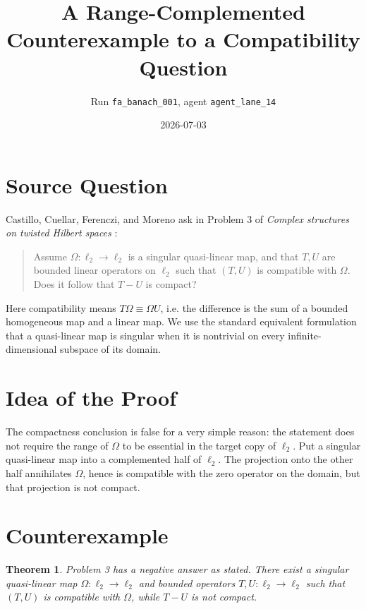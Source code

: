 \documentclass[11pt]{article}
\title{A Range-Complemented Counterexample to a Compatibility Question}
\author{Run \texttt{fa\_banach\_001}, agent \texttt{agent\_lane\_14}}
\date{2026-07-03}
\newtheorem{theorem}{Theorem}
\begin{document}
\maketitle

\section*{Source Question}

Castillo, Cuellar, Ferenczi, and Moreno ask in Problem 3 of
\emph{Complex structures on twisted Hilbert spaces} \cite{CCFM}:

\begin{quote}
Assume $\Omega:\ell_2\to \ell_2$ is a singular quasi-linear map, and that
$T,U$ are bounded linear operators on $\ell_2$ such that $(T,U)$ is compatible
with $\Omega$. Does it follow that $T-U$ is compact?
\end{quote}

Here compatibility means $T\Omega \equiv \Omega U$, i.e. the difference is
the sum of a bounded homogeneous map and a linear map. We use the standard
equivalent formulation that a quasi-linear map is singular when it is
nontrivial on every infinite-dimensional subspace of its domain.

\section*{Idea of the Proof}

The compactness conclusion is false for a very simple reason: the statement
does not require the range of $\Omega$ to be essential in the target copy of
$\ell_2$. Put a singular quasi-linear map into a complemented half of
$\ell_2$. The projection onto the other half annihilates $\Omega$, hence is
compatible with the zero operator on the domain, but that projection is not
compact.

\section*{Counterexample}

\begin{theorem}
Problem 3 has a negative answer as stated. There exist a singular
quasi-linear map $\Omega:\ell_2\to\ell_2$ and bounded operators
$T,U:\ell_2\to\ell_2$ such that $(T,U)$ is compatible with $\Omega$, while
$T-U$ is not compact.
\end{theorem}
\end{document}
